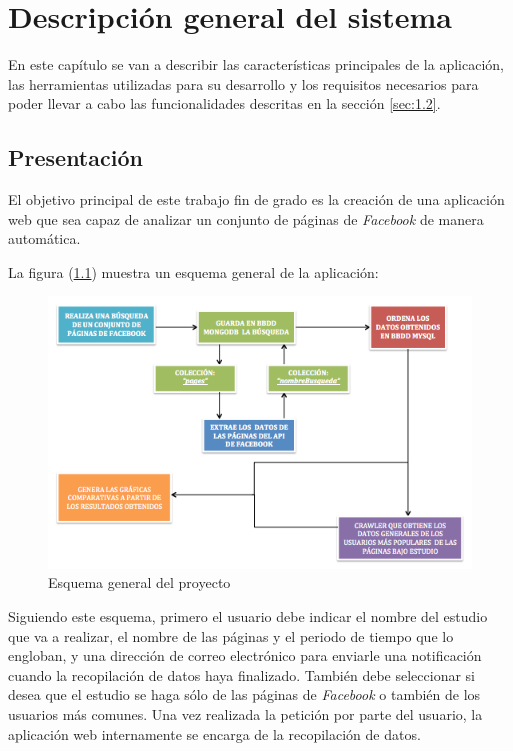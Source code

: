 \chapter{Descripción general del sistema}
En este capítulo se van a describir las características principales de la aplicación, las herramientas utilizadas para su desarrollo y los requisitos necesarios para poder llevar a cabo las funcionalidades descritas en la sección \ref{sec:1.2}.

\section{Presentación}
El objetivo principal de este trabajo fin de grado es la creación de una aplicación web que sea capaz de analizar un conjunto de páginas de \textit{Facebook} de manera automática. 

La figura (\ref{fig:general}) muestra un esquema general de la aplicación:

\begin{figure}[H]
\centering
\includegraphics[width=5in]{figuras/esquemaGeneral.png}
\caption{Esquema general del proyecto} \label{fig:general}
\end{figure}

Siguiendo este esquema, primero el usuario debe indicar el nombre del estudio que va a realizar, el nombre de las páginas y el periodo de tiempo que lo engloban, y una dirección de correo electrónico para enviarle una notificación cuando la recopilación de datos haya finalizado. También debe seleccionar si desea que el estudio se haga sólo de las páginas de \textit{Facebook} o también de los usuarios más comunes. Una vez realizada la petición por parte del usuario, la aplicación web internamente se encarga de la recopilación de datos.
 
